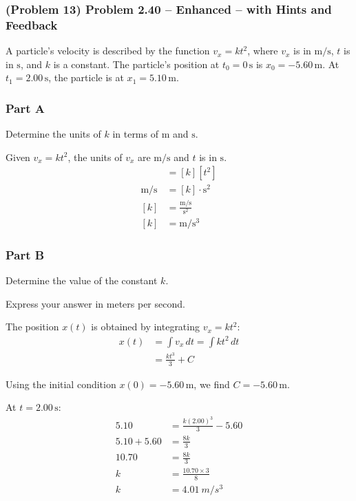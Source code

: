 \newpage

\subsubsection{(Problem 13) Problem 2.40 -- Enhanced -- with Hints and Feedback}

A particle's velocity is described by the function \( v_x = k t^2 \), where \( v_x \) is in \( \mathrm{m/s} \), \( t \) is in \( \mathrm{s} \), and \( k \) is a constant. The particle's position at \( t_0 = 0 \, \mathrm{s} \) is \( x_0 = -5.60 \, \mathrm{m} \). At \( t_1 = 2.00 \, \mathrm{s} \), the particle is at \( x_1 = 5.10 \, \mathrm{m} \).

\subsubsection{Part A}
Determine the units of \( k \) in terms of \( \mathrm{m} \) and \( \mathrm{s} \).

\begin{solution}
	Given \( v_x = k t^2 \), the units of \( v_x \) are \( \mathrm{m/s} \) and \( t \) is in \( \mathrm{s} \).
	\begin{align*}
		[v_x] &= [k] [t^2] \\
		\mathrm{m/s} &= [k] \cdot \mathrm{s^2} \\
		[k] &= \frac{\mathrm{m/s}}{\mathrm{s^2}} \\
		[k] &= \mathrm{m/s^3}
	\end{align*}
\end{solution}

\subsubsection{Part B}
Determine the value of the constant \( k \).

Express your answer in meters per second.

\begin{solution}
	The position \( x(t) \) is obtained by integrating \( v_x = k t^2 \):
	\begin{align*}
		x(t) &= \int v_x \, dt = \int k t^2 \, dt \\
		&= \frac{k t^3}{3} + C
	\end{align*}

	Using the initial condition \( x(0) = -5.60 \, \mathrm{m} \), we find \( C = -5.60 \, \mathrm{m} \).

	At \( t = 2.00 \, \mathrm{s} \):
	\begin{align*}
		5.10 &= \frac{k (2.00)^3}{3} - 5.60 \\
		5.10 + 5.60 &= \frac{8k}{3} \\
		10.70 &= \frac{8k}{3} \\
		k &= \frac{10.70 \times 3}{8} \\
		k &= \SI{4.01}{m/s^3}
	\end{align*}
\end{solution}

